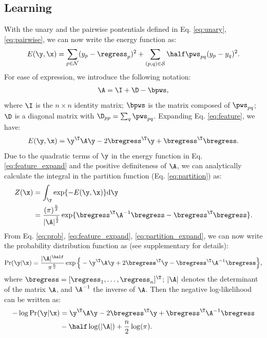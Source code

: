 \subsection{Learning}
\label{sec:learning}
With the unary and the pairwise pontentials defined in Eq. \eqref{eq:unary}, \eqref{eq:pairwise}, we can now write the energy function as:
\begin{equation}\label{eq:feature}
E(\y, \x) = \sum_{p \in {\cal N} } (y_p - \regress_p)^2 
+ \sum_{(p,q) \in {\cal S}} \half \pws_{pq} (y_p - y_q)^2.
\end{equation}
For ease of expression, we introduce the following notation: 
\begin{align} \label{eq:def_Amat}
 \A = \I+ \D - \bpws, 
\end{align}
%
%
%
where $\I$ is the $ n \times n$ identity matrix; $\bpws$ is the matrix composed of $\pws_{pq}$;  $\D$ is a diagonal matrix with $\D_{pp} = \sum_q \pws_{pq}$.
Expanding Eq. \eqref{eq:feature}, we have:
\begin{align} \label{eq:feature_expand}
E(\y, \x) = \y^\T \A \y - 2\bregress^\T \y + \bregress^\T \bregress.
\end{align}
Due to the quadratic terms of $\y$ in the energy function in Eq. \eqref{eq:feature_expand} and the positive definiteness of $\A$, we can analytically calculate the integral in the partition function (Eq. \eqref{eq:partition}) as:
\begin{align} \label{eq:partition_expand}
Z(\x) &= \int_{\y} \exp \{ -E(\y, \x) \}\mathrm{d}\y  \notag \\
 	&=\frac{{(\pi)}^{\frac{n}{2}}}{{|\A|}^{\frac{1}{2}}} \exp \{{ \bregress ^\T \A^{-1} \bregress} - \bregress^\T \bregress \}.
\end{align}
From Eq. \eqref{eq:prob}, \eqref{eq:feature_expand},  \eqref{eq:partition_expand},  we can now write the probability distribution function as (see supplementary for details):
\begin{align} \label{eq:prob_final}
\Pr(\y|\x) =\frac{ |\A|^{\half}} {{\pi^{\frac{n}{2}}}} \exp \Big\{ - \y^\T \A \y + 2\bregress^\T \y -  \bregress ^\T \A^{-1} \bregress \Big\}, 
\end{align}
where $\bregress=[\regress_1, \ldots, \regress_n]^{\T}$; $|\A|$ denotes the determinant of the matrix $\A$, and $\A^{-1}$ the inverse of $\A$.
Then the negative log-likelihood can be written as:
\begin{align} \label{eq:log-likelihood}
-\log\Pr(\y|\x)&= \y^\T \A \y - 2\bregress^\T \y + \bregress ^\T \A^{-1} \bregress  \\ \notag
& - \half\log(|\A|) + \frac{n}{2}\log(\pi). 
\end{align}



